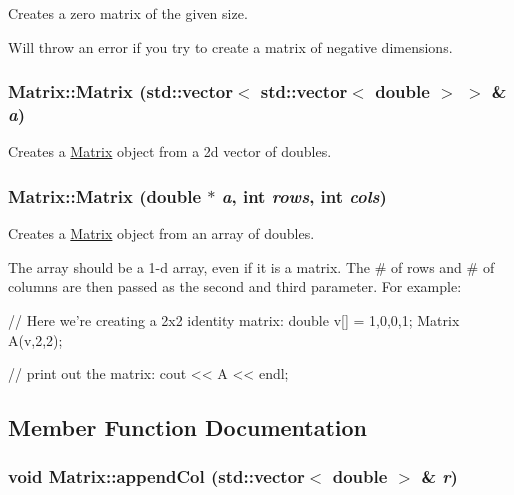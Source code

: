 Creates a zero matrix of the given size. 

Will throw an error if you try to create a matrix of negative dimensions. \hypertarget{class_matrix_a0db283ef4ea2660f8d0c1b58f9e74f49}{
\subsubsection[{Matrix}]{\setlength{\rightskip}{0pt plus 5cm}Matrix::Matrix (std::vector$<$ std::vector$<$ double $>$ $>$ \& {\em a})}}
\label{class_matrix_a0db283ef4ea2660f8d0c1b58f9e74f49}


Creates a \hyperlink{class_matrix}{Matrix} object from a 2d vector of doubles. 

\hypertarget{class_matrix_a3179cefb929e09cbdc95d143e1d9e3d2}{
\subsubsection[{Matrix}]{\setlength{\rightskip}{0pt plus 5cm}Matrix::Matrix (double $\ast$ {\em a}, \/  int {\em rows}, \/  int {\em cols})}}
\label{class_matrix_a3179cefb929e09cbdc95d143e1d9e3d2}


Creates a \hyperlink{class_matrix}{Matrix} object from an array of doubles. 

The array should be a 1-\/d array, even if it is a matrix. The \# of rows and \# of columns are then passed as the second and third parameter. For example:


\begin{DoxyCode}
            // Here we're creating a 2x2 identity matrix:
            double v[] = {1,0,0,1};
            Matrix A(v,2,2);
            
            // print out the matrix:
            cout << A << endl;
\end{DoxyCode}
 

\subsection{Member Function Documentation}
\hypertarget{class_matrix_a726f7ae83284c090af821752628974af}{
\subsubsection[{appendCol}]{\setlength{\rightskip}{0pt plus 5cm}void Matrix::appendCol (std::vector$<$ double $>$ \& {\em r})}}
\label{class_matrix_a726f7ae83284c090af821752628974af}


